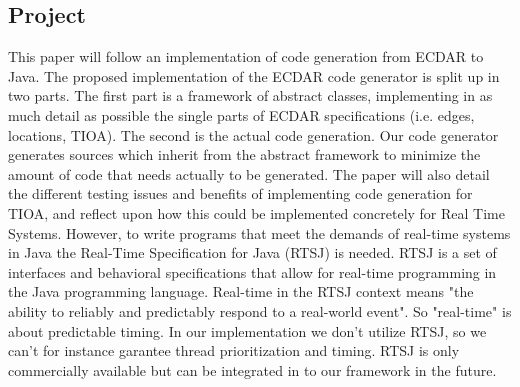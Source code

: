 \subsection{Project}
\label{introduction-problemfield}
This paper will follow an implementation of code generation from ECDAR to
Java. The proposed implementation of the ECDAR code generator is split up in two
parts. The first part is a framework of abstract classes, implementing in as
much detail as possible the single parts of ECDAR specifications (i.e. edges,
locations, TIOA). The second is the actual code generation. Our code generator
generates sources which inherit from the abstract framework to minimize the
amount of code that needs actually to be generated. The paper will also detail
the different testing issues and benefits of implementing code generation for
TIOA, and reflect upon how this could be implemented concretely for Real Time
Systems.  However, to write programs that meet the demands of real-time systems 
in Java the Real-Time Specification for Java (RTSJ) is needed. RTSJ is a set of interfaces 
and behavioral specifications that allow for real-time programming in the Java programming language. 
Real-time in the RTSJ context means "the ability to reliably and predictably respond to a real-world event". 
So "real-time" is about predictable timing. In our implementation we don't utilize RTSJ, so we can't for instance 
garantee thread prioritization and timing. RTSJ is only commercially available but can be integrated in to our framework in the future.